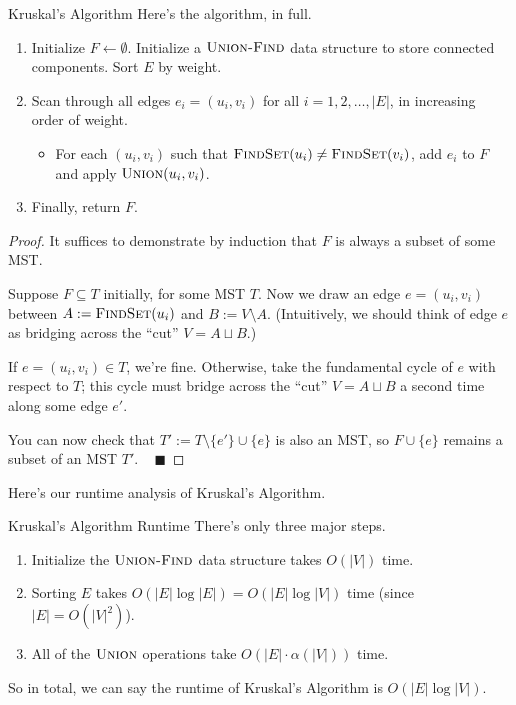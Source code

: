 \begin{solution}{Kruskal's Algorithm}
    Here's the algorithm, in full.
    \begin{enumerate}
        \item Initialize $F \leftarrow \emptyset$.  Initialize a $\textsc{Union-Find}$ data structure to store connected components.  Sort $E$ by weight.
        \item Scan through all edges $e_i = (u_i, v_i)$ for all $i = 1, 2, \dots, |E|$, in increasing order of weight.
        \begin{itemize}
            \item For each $(u_i, v_i)$ such that $\textsc{FindSet}(u_i) \neq \textsc{FindSet}(v_i)$, add $e_i$ to $F$ and apply $\textsc{Union}(u_i, v_i)$.
        \end{itemize}
        \item Finally, return $F$.
    \end{enumerate}
\end{solution}

\begin{proof}
    It suffices to demonstrate by induction that $F$ is always a subset of some MST.

    Suppose $F \subseteq T$ initially, for some MST $T$.  Now we draw an edge $e = (u_i, v_i)$ between $A := \textsc{FindSet}(u_i)$ and $B := V \setminus A$.  (Intuitively, we should think of edge $e$ as bridging across the ``cut'' $V = A \sqcup B$.)

    If $e = (u_i, v_i) \in T$, we're fine.  Otherwise, take the fundamental cycle of $e$ with respect to $T$; this cycle must bridge across the ``cut'' $V = A \sqcup B$ a second time along some edge $e'$.

    You can now check that $T' := T \setminus \{e'\} \cup \{e\}$ is also an MST, so $F \cup \{e\}$ remains a subset of an MST $T'$. ~ $\blacksquare$
\end{proof}

Here's our runtime analysis of Kruskal's Algorithm.

\begin{solution}{Kruskal's Algorithm Runtime}
There's only three major steps.
    \begin{enumerate}
        \item Initialize the $\textsc{Union-Find}$ data structure takes $O(|V|)$ time.
        \item Sorting $E$ takes $O(|E| \log |E|) = O(|E| \log |V|)$ time (since $|E| = O(|V|^2)$).
        \item All of the $\textsc{Union}$ operations take $O(|E| \cdot \alpha(|V|))$ time.
    \end{enumerate}
So in total, we can say the runtime of Kruskal's Algorithm is $O(|E| \log |V|)$.
\end{solution}

